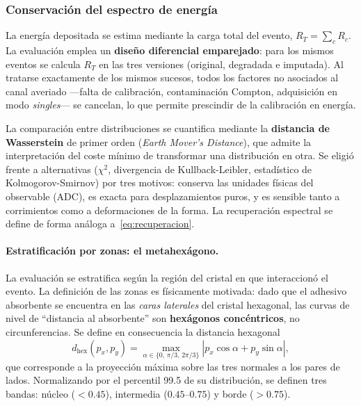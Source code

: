 \subsubsection{Conservación del espectro de energía}
\label{subsec:met-espectro}

La energía depositada se estima mediante la carga total del evento, $R_T = \sum_c R_c$. La
evaluación emplea un \textbf{diseño diferencial emparejado}: para los mismos eventos se calcula
$R_T$ en las tres versiones (original, degradada e imputada). Al tratarse exactamente de los mismos
sucesos, todos los factores no asociados al canal averiado ---falta de calibración, contaminación
Compton, adquisición en modo \emph{singles}--- se cancelan, lo que permite prescindir de la
calibración en energía.

La comparación entre distribuciones se cuantifica mediante la \textbf{distancia de Wasserstein} de
primer orden (\emph{Earth Mover's Distance}), que admite la interpretación del coste mínimo de
transformar una distribución en otra. Se eligió frente a alternativas ($\chi^2$, divergencia de
Kullback-Leibler, estadístico de Kolmogorov-Smirnov) por tres motivos: conserva las unidades físicas
del observable (ADC), es exacta para desplazamientos puros, y es sensible tanto a corrimientos como
a deformaciones de la forma. La recuperación espectral se define de forma análoga
a~\eqref{eq:recuperacion}.

\paragraph{Estratificación por zonas: el metahexágono.} La evaluación se estratifica según la región
del cristal en que interaccionó el evento. La definición de las zonas es físicamente motivada: dado
que el adhesivo absorbente se encuentra en las \emph{caras laterales} del cristal hexagonal, las
curvas de nivel de ``distancia al absorbente'' son \textbf{hexágonos concéntricos}, no
circunferencias. Se define en consecuencia la distancia hexagonal
\begin{equation}
    d_{\text{hex}}(p_x, p_y) = \max_{\alpha \in \{0,\, \pi/3,\, 2\pi/3\}}
    \left| p_x \cos\alpha + p_y \sin\alpha \right|,
    \label{eq:distancia-hexagonal}
\end{equation}
que corresponde a la proyección máxima sobre las tres normales a los pares de lados. Normalizando
por el percentil 99.5 de su distribución, se definen tres bandas: núcleo ($<0.45$), intermedia
($0.45$--$0.75$) y borde ($>0.75$).

